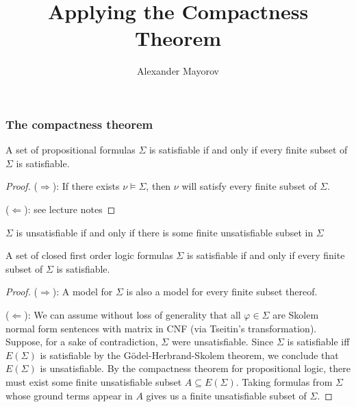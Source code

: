 \documentclass{beamer}
\title{Applying the Compactness Theorem}
\author{Alexander Mayorov}
\institute{TU Kaiserslautern}
\begin{document}
	
\frame{\titlepage}

\begin{frame}
	\frametitle{The compactness theorem}
	\begin{theorem}
		A set of propositional formulas $ \Sigma $ is satisfiable if and only if every finite subset of $ \Sigma $ is satisfiable.
	\end{theorem}
	\begin{proof}
		($ \Rightarrow $): If there exists $ \nu \models \Sigma $, then $ \nu $ will satisfy every finite subset of $ \Sigma $.
		
		($ \Leftarrow $): see lecture notes
	\end{proof}

	\pause

	\begin{theorem}
		$ \Sigma $ is unsatisfiable if and only if there is some finite unsatisfiable subset in $ \Sigma $
	\end{theorem}
\end{frame}

\begin{frame}
	\begin{theorem}
		A set of closed first order logic formulas $ \Sigma $ is satisfiable if and only if every finite subset of $ \Sigma $ is satisfiable.
	\end{theorem}
	\pause
	\begin{proof}
		($ \Rightarrow $): A model for $ \Sigma $ is also a model for every finite subset thereof.
		
		($ \Leftarrow $): We can assume without loss of generality that all $ \varphi \in \Sigma $ are Skolem normal form sentences with matrix in CNF (via Tseitin's transformation). Suppose, for a sake of contradiction, $ \Sigma $ were unsatisfiable. Since $ \Sigma $ is satisfiable iff $ E(\Sigma) $ is satisfiable by the Gödel-Herbrand-Skolem theorem, we conclude that $ E(\Sigma) $ is unsatisfiable. By the \alert{compactness theorem for propositional logic}, there must exist some finite unsatisfiable subset $ A \subseteq E(\Sigma) $. Taking formulas from $ \Sigma $ whose ground terms appear in $ A $ gives us a finite unsatisfiable subset of $ \Sigma $.
	\end{proof}
\end{frame}
\end{document}

